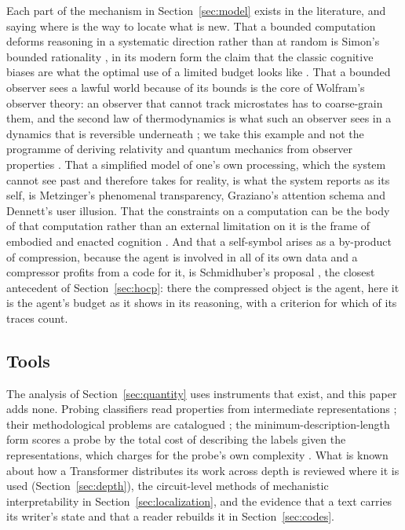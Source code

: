 Each part of the mechanism in Section~\ref{sec:model} exists in the literature, and saying where is the
way to locate what is new. That a bounded computation deforms reasoning in a systematic direction
rather than at random is Simon's bounded rationality \citep{simon1955}, in its modern form the claim
that the classic cognitive biases are what the optimal use of a limited budget looks like
\citep{lieder2020,griffiths2015}. That a bounded observer sees a lawful world because of its bounds is
the core of Wolfram's observer theory: an observer that cannot track microstates has to coarse-grain
them, and the second law of thermodynamics is what such an observer sees in a dynamics that is
reversible underneath \citep{wolfram2023}; we take this example and not the programme of deriving
relativity and quantum mechanics from observer properties \citep{wolfram2020}. That a simplified model
of one's own processing, which the system cannot see past and therefore takes for reality, is what the
system reports as its self, is Metzinger's phenomenal transparency, Graziano's attention schema and
Dennett's user illusion. That the constraints on a computation can be the body of that computation
rather than an external limitation on it is the frame of embodied and enacted cognition
\citep{varela1991}. And that a self-symbol arises as a by-product of compression, because the agent is
involved in all of its own data and a compressor profits from a code for it, is Schmidhuber's
proposal \citep{schmidhuber2010}, the closest antecedent of Section~\ref{sec:hocp}: there the
compressed object is the agent, here it is the agent's budget as it shows in its reasoning, with a
criterion for which of its traces count.

\subsection{Tools}

The analysis of Section~\ref{sec:quantity} uses instruments that exist, and this paper adds none. Probing classifiers read
properties from intermediate representations \citep{alain2016}; their methodological problems are
catalogued \citep{belinkov2022}; the minimum-description-length form scores a probe by the total cost
of describing the labels given the representations, which charges for the probe's own complexity
\citep{voita2020}. What is known about how a Transformer distributes its work across depth is reviewed
where it is used (Section~\ref{sec:depth}), the circuit-level methods of mechanistic interpretability
in Section~\ref{sec:localization}, and the evidence that a text carries its writer's state and that a
reader rebuilds it in Section~\ref{sec:codes}.
